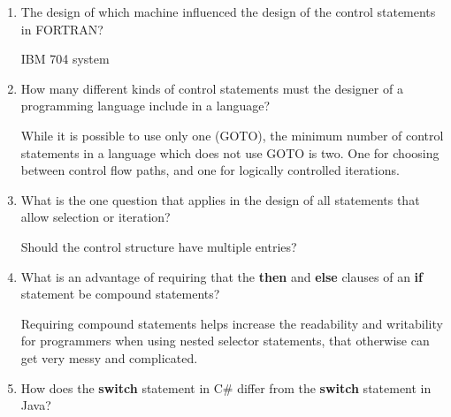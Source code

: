 \begin{enumerate}
  \item The design of which machine influenced the design
    of the control statements in FORTRAN?

  \begin{answer}

    IBM 704 system

  \end{answer}

  \item How many different kinds of control statements
    must the designer of a programming language include
    in a language?

  \begin{answer}

    While it is possible to use only one (GOTO), the
    minimum number of control statements in a language
    which does not use GOTO is two. One for choosing
    between control flow paths, and one for logically
    controlled iterations.

  \end{answer}

  \item What is the one question that applies in the
    design of all statements that allow selection or
    iteration?

  \begin{answer}

    Should the control structure have multiple entries?

  \end{answer}

  \item What is an advantage of requiring that
    the \textbf{then} and \textbf{else} clauses of
    an \textbf{if} statement be compound statements?

  \begin{answer}

    Requiring compound statements helps increase the
    readability and writability for programmers when
    using nested selector statements, that otherwise
    can get very messy and complicated.

  \end{answer}

  \item How does the \textbf{switch} statement in C\#
    differ from the \textbf{switch} statement in Java?

  \begin{answer}


\end{answer}
\end{enumerate}
